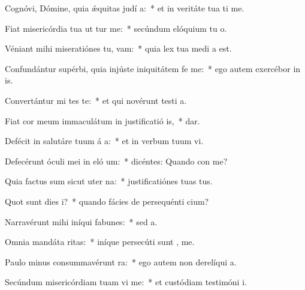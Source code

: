\item Cognóvi, Dómine, quia ǽquitas judí a:~* et in veritáte tua ti me.
\item Fiat misericórdia tua ut tur me:~* secúndum elóquium tu  o.
\item Véniant mihi miseratiónes tu,  vam:~* quia lex tua medi a est.
\item Confundántur supérbi, quia injúste iniquitátem fe  me:~* ego autem exercébor in  is.
\item Convertántur mi tes te:~* et qui novérunt testi a.
\item Fiat cor meum immaculátum in justificatió is,~*   dar.
\item Defécit in salutáre tuum á a:~* et in verbum tuum vi.
\item Defecérunt óculi mei in eló um:~* dicéntes: Quando con me?
\item Quia factus sum sicut uter  na:~* justificatiónes tuas   tus.
\item Quot sunt dies  i?~* quando fácies de persequénti  cium?
\item Narravérunt mihi iníqui fabunes:~* sed    a.
\item Omnia mandáta  ritas:~* iníque persecúti sunt ,  me.
\item Paulo minus consummavérunt   ra:~* ego autem non derelíqui  a.
\item Secúndum misericórdiam tuam vi me:~* et custódiam testimóni  i.
